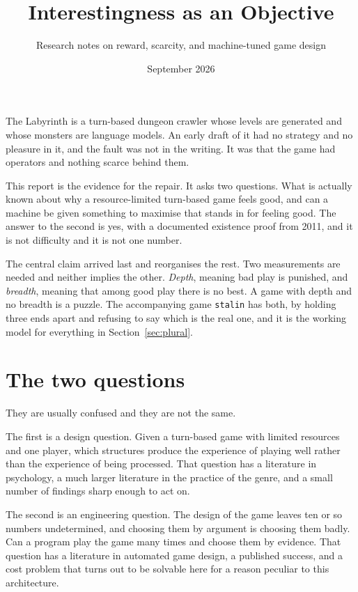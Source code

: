 \documentclass[11pt,a4paper]{article}
\title{\vspace{-2em}Interestingness as an Objective}
\author{\normalsize Research notes on reward, scarcity, and machine-tuned game design}
\date{September 2026}
\begin{document}
\maketitle
\vspace{-2em}

\begin{sectionbox}
The Labyrinth is a turn-based dungeon crawler whose levels are generated and whose monsters are
language models. An early draft of it had no strategy and no pleasure in it, and the fault was
not in the writing. It was that the game had operators and nothing scarce behind them.

\medskip

This report is the evidence for the repair. It asks two questions. What is actually known about
why a resource-limited turn-based game feels good, and can a machine be given something to
maximise that stands in for feeling good. The answer to the second is yes, with a documented
existence proof from 2011, and it is not difficulty and it is not one number.

\medskip

The central claim arrived last and reorganises the rest. Two measurements are needed and neither
implies the other. \emph{Depth}, meaning bad play is punished, and \emph{breadth}, meaning that
among good play there is no best. A game with depth and no breadth is a puzzle. The accompanying
game \texttt{stalin} has both, by holding three ends apart and refusing to say which is the real
one, and it is the working model for everything in Section~\ref{sec:plural}.
\end{sectionbox}

\section{The two questions}

They are usually confused and they are not the same.

The first is a design question. Given a turn-based game with limited resources and one player,
which structures produce the experience of playing well rather than the experience of being
processed. That question has a literature in psychology, a much larger literature in the practice
of the genre, and a small number of findings sharp enough to act on.

The second is an engineering question. The design of the game leaves ten or so numbers
undetermined, and choosing them by argument is choosing them badly. Can a program play the game
many times and choose them by evidence. That question has a literature in automated game design,
a published success, and a cost problem that turns out to be solvable here for a reason peculiar
to this architecture.
\end{document}
